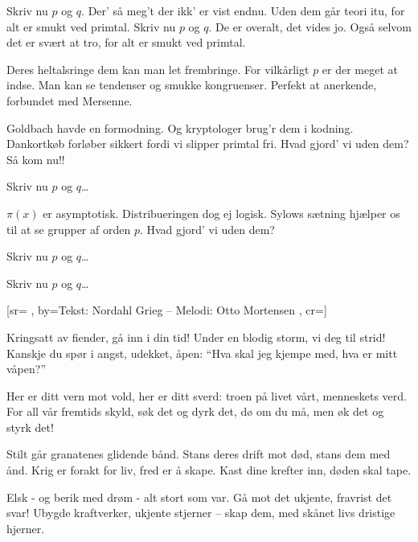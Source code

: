 \documentclass[pdftex,12pt]{article}
\begin{document}
\begin{songs}{}
\beginverse
Skriv nu $p$ og $q$.
Der’ så meg’t der ikk’ er vist endnu.
Uden dem går teori itu,
for alt er smukt ved primtal.
Skriv nu $p$ og $q$.
De er overalt, det vides jo.
Også selvom det er svært at tro,
for alt er smukt ved primtal.
\endverse

\beginverse
Deres heltalsringe
dem kan man let frembringe.
For vilkårligt $p$
er der meget at indse.
Man kan se tendenser
og smukke kongruenser.
Perfekt at anerkende,
forbundet med Mersenne.
\endverse

\beginverse
Goldbach havde en formodning.
Og kryptologer brug’r dem i kodning.
Dankortkøb forløber sikkert fordi
vi slipper primtal fri.
Hvad gjord’ vi uden dem?
Så kom nu!!
\endverse

\beginverse
Skriv nu $p$ og $q$\ldots
\endverse

\beginverse
$\pi(x)$ er asymptotisk.
Distribueringen dog ej logisk.
Sylows sætning hjælper os til at se
grupper af orden $p$.
Hvad gjord’ vi uden dem?
\endverse

\beginverse
Skriv nu $p$ og $q$\ldots
\endverse

\beginverse
Skriv nu $p$ og $q$\ldots
\endverse
\endsong



﻿[sr={}
,
by={Tekst: Nordahl Grieg -- Melodi: Otto Mortensen}
,
cr={}]\hypertarget{Kringsatt av fiender}{}
\label{song84}

\beginverse
Kringsatt av fiender, gå
inn i din tid!
Under en blodig storm,
vi deg til strid!
 Kanskje du spør i angst,
udekket, åpen:
 ``Hva skal jeg kjempe med,
hva er mitt våpen?''
\endverse

\beginverse

Her er ditt vern mot vold,
her er ditt sverd:
 troen på livet vårt,
menneskets verd.
 For all vår fremtids skyld,
søk det og dyrk det,
 dø om du må, men
øk det og styrk det!
\endverse

\beginverse

Stilt går granatenes
glidende bånd.
 Stans deres drift mot død,
stans dem med ånd.
 Krig er forakt for liv,
fred er å skape.
 Kast dine krefter inn,
døden skal tape.
\endverse

\beginverse

Elsk - og berik med drøm -
alt stort som var.
 Gå mot det ukjente,
fravrist det svar!
 Ubygde kraftverker,
ukjente stjerner –
 skap dem, med skånet livs
dristige hjerner.
\endverse


\end{songs}
\end{document}
